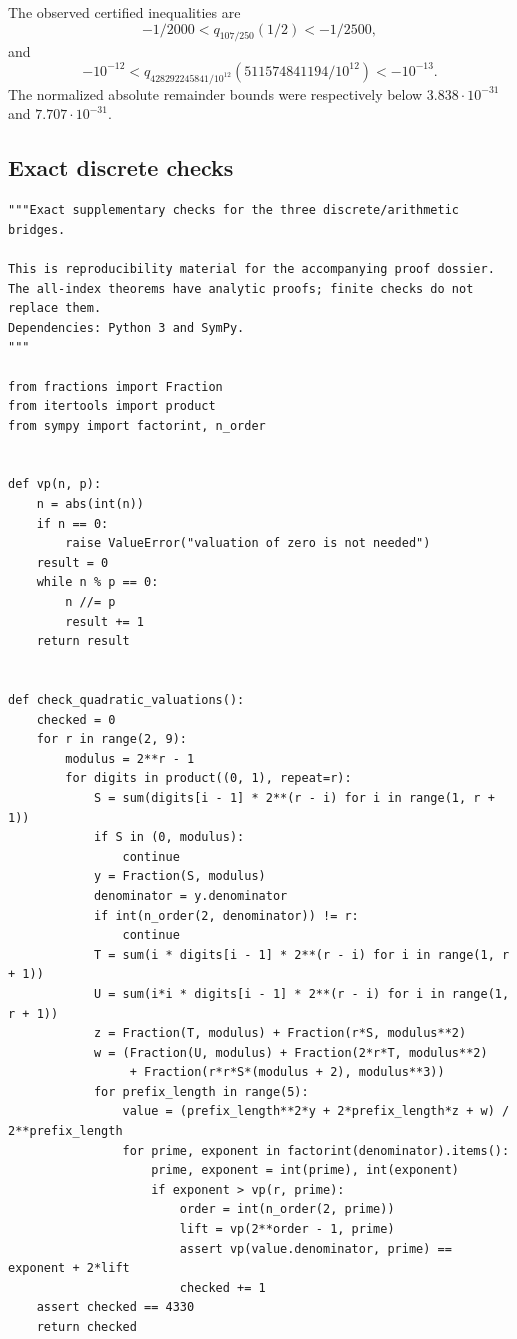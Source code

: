 \documentclass[11pt,a4paper]{article}
\theoremstyle{definition}
\theoremstyle{remark}
\numberwithin{equation}{section}
\begin{document}
The observed certified inequalities are
\[
 -1/2000<q_{107/250}(1/2)<-1/2500,
\]
and
\[
 -10^{-12}<
 q_{428292245841/10^{12}}(511574841194/10^{12})
 <-10^{-13}.
\]
The normalized absolute remainder bounds were respectively below
$3.838\cdot10^{-31}$ and $7.707\cdot10^{-31}$.

\subsection{Exact discrete checks}
\begin{lstlisting}
"""Exact supplementary checks for the three discrete/arithmetic bridges.

This is reproducibility material for the accompanying proof dossier.
The all-index theorems have analytic proofs; finite checks do not replace them.
Dependencies: Python 3 and SymPy.
"""

from fractions import Fraction
from itertools import product
from sympy import factorint, n_order


def vp(n, p):
    n = abs(int(n))
    if n == 0:
        raise ValueError("valuation of zero is not needed")
    result = 0
    while n % p == 0:
        n //= p
        result += 1
    return result


def check_quadratic_valuations():
    checked = 0
    for r in range(2, 9):
        modulus = 2**r - 1
        for digits in product((0, 1), repeat=r):
            S = sum(digits[i - 1] * 2**(r - i) for i in range(1, r + 1))
            if S in (0, modulus):
                continue
            y = Fraction(S, modulus)
            denominator = y.denominator
            if int(n_order(2, denominator)) != r:
                continue
            T = sum(i * digits[i - 1] * 2**(r - i) for i in range(1, r + 1))
            U = sum(i*i * digits[i - 1] * 2**(r - i) for i in range(1, r + 1))
            z = Fraction(T, modulus) + Fraction(r*S, modulus**2)
            w = (Fraction(U, modulus) + Fraction(2*r*T, modulus**2)
                 + Fraction(r*r*S*(modulus + 2), modulus**3))
            for prefix_length in range(5):
                value = (prefix_length**2*y + 2*prefix_length*z + w) / 2**prefix_length
                for prime, exponent in factorint(denominator).items():
                    prime, exponent = int(prime), int(exponent)
                    if exponent > vp(r, prime):
                        order = int(n_order(2, prime))
                        lift = vp(2**order - 1, prime)
                        assert vp(value.denominator, prime) == exponent + 2*lift
                        checked += 1
    assert checked == 4330
    return checked



\end{lstlisting}
\end{document}
